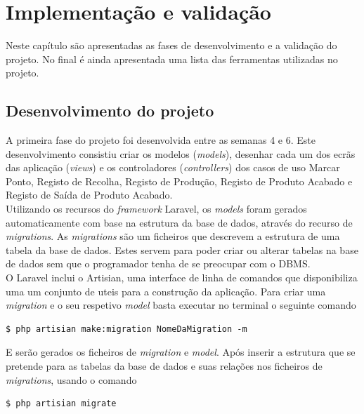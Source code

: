 \chapter{Implementação e validação} 
\label{cap:5}
Neste capítulo são apresentadas as fases de desenvolvimento e a validação do projeto. No final é ainda apresentada uma lista das ferramentas utilizadas no projeto.

\section{Desenvolvimento do projeto}
A primeira fase do projeto foi desenvolvida entre as semanas 4 e 6. Este desenvolvimento consistiu criar os modelos (\textit{models}), desenhar cada um dos ecrãs das aplicação (\textit{views}) e os controladores (\textit{controllers}) dos casos de uso Marcar Ponto, Registo de Recolha, Registo de Produção, Registo de Produto Acabado e Registo de Saída de Produto Acabado.\\
Utilizando os recursos do \textit{framework} Laravel, os \textit{models} foram gerados automaticamente com base na estrutura da base de dados, através do recurso de \textit{migrations}. As \textit{migrations} são um ficheiros que descrevem a estrutura de uma tabela da base de dados. Estes servem para poder criar ou alterar tabelas na base de dados sem que o programador tenha de se preocupar com o DBMS.\\
O Laravel inclui o Artisian, uma interface de linha de comandos que disponibiliza uma um conjunto de uteis para a construção da aplicação\cite{Laravelb}.
Para criar uma \textit{migration} e o seu respetivo \textit{model} basta executar no terminal o seguinte comando

\begin{lstlisting}
$ php artisian make:migration NomeDaMigration -m
\end{lstlisting}

\noindent
E serão gerados os ficheiros de \textit{migration} e \textit{model}. Após inserir a estrutura que se pretende para as tabelas da base de dados e suas relações nos ficheiros de \textit{migrations}, usando o comando

\begin{lstlisting}
$ php artisian migrate
\end{lstlisting}

